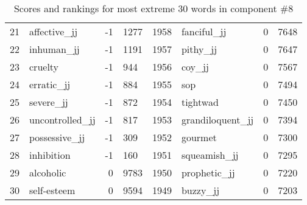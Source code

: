 \begin{table}[tbp]
\begin{tabular}{| rlr@{.}l | rlr@{.}l |}
    21 & affective\_jj & -1 & 1277    &    1958 & fanciful\_jj & 0 & 7648 \\
    22 & inhuman\_jj & -1 & 1191    &    1957 & pithy\_jj & 0 & 7647 \\
    23 & cruelty & -1 & 944    &    1956 & coy\_jj & 0 & 7567 \\
    24 & erratic\_jj & -1 & 884    &    1955 & sop & 0 & 7494 \\
    25 & severe\_jj & -1 & 872    &    1954 & tightwad & 0 & 7450 \\
    26 & uncontrolled\_jj & -1 & 817    &    1953 & grandiloquent\_jj & 0 & 7394 \\
    27 & possessive\_jj & -1 & 309    &    1952 & gourmet & 0 & 7300 \\
    28 & inhibition & -1 & 160    &    1951 & squeamish\_jj & 0 & 7295 \\
    29 & alcoholic & 0 & 9783    &    1950 & prophetic\_jj & 0 & 7220 \\
    30 & self-esteem & 0 & 9594    &    1949 & buzzy\_jj & 0 & 7203 \\
    \hline
    \end{tabular}
    \caption{Scores and rankings for most extreme 30 words in component \#8} 
\end{table}
\clearpage
